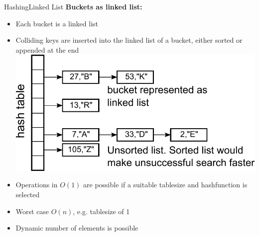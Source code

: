 \begin{frame}{Hashing}{Linked List}
  \textbf{Buckets as linked list:}
  \begin{itemize}
    \item<2->
      Each bucket is a linked list
    \item<3->
      Colliding keys are inserted into the linked list of a bucket, either sorted or appended at the end
\includegraphics[height=0.35\textheight]{Images/hashtable-buckets.pdf}
   \item<5->
     Operations in {\color{MainA}$O(1)$} are possible if a suitable tablesize and hashfunction is
     selected
   \item<6->
     Worst case {\color{MainA}$O(n)$}, e.g. tablesize of 1
   \item<7->
     Dynamic number of elements is possible 
  \end{itemize}
\end{frame}

